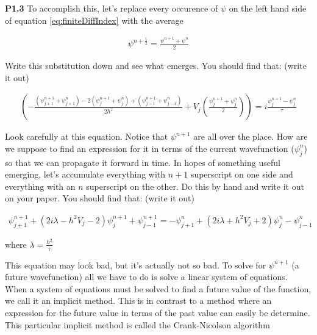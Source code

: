 \vspace{0.25in}
\begin{minipage}{0.9\linewidth}
\noindent\textbf{P1.3} To accomplish this, let's replace every occurence of $\psi$ on
the left hand side of equation \eqref{eq:finiteDiffIndex} with the average

\begin{align}
\psi^{n + \frac{1}{2}} = \frac{\psi^{n + 1}+ \psi^n}{2}
\end{align} 

Write this substitution down and see what emerges.  You should find
that: (write it out)

\begin{align}
 \left( - \frac{(\psi_{j+1}^{n + 1}+ \psi_{j+1}^n) - 2 (\psi_j^{n + 1}+ \psi_j^n) + (\psi_{j-1}^{n + 1}+ \psi_{j-1}^n)}{2h^2} +
   V_j (\frac{\psi_j^{n+1} + \psi_j^n}{2}) \right) = i \frac{\psi_j^{n+1} -
   \psi_j^n}{\tau}
\end{align}

Look carefully at this equation.  Notice that $\psi^{n+1}$ are all
over the place.  How are we suppose to find an expression for it in
terms of the current wavefunction ($\psi_j^n$) so that we can
propagate it forward in time.  In hopes of something useful emerging,
let's accumulate everything with $n+1$ superscript on one side and
everything with an $n$ superscript on the other.  Do this by hand and
write it out on your paper.  You should find that: (write it out)


\begin{align}
\psi_{j+1}^{n+1} + \left(2i \lambda - h^2 V_j - 2\right)
\psi_j^{n+1} + \psi_{j-1}^{n+1} = - \psi_{j+1}^n + \left( 2 i \lambda
  + h^2V_j + 2\right) \psi_j^n - \psi_{j-1}^n\label{eq:CN}
\end{align}

where $\lambda = \frac{h^2}{\tau}$

\end{minipage}
\vspace{0.25in}


This equation may look bad, but it's actually not so bad.  To solve
for $\psi^{n+1}$ (a future wavefunction) all we have to do is solve a
linear system of equations.  When a system of equations must be solved
to find a future value of the function, we call it an implicit method.
This is in contrast to a method where an expression for the future
value in terms of the past value can easily be determine.  This
particular implicit method is called the Crank-Nicolson algorithm

